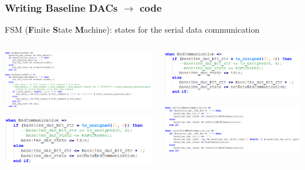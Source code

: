 \documentclass[aspectratio=169]{beamer}
\begin{document}
	\begin{frame}[fragile]
		\frametitle{Writing Baseline DACs $\rightarrow$ code}
		FSM (\textbf{F}inite \textbf{S}tate \textbf{M}achine): states for the serial data communication 
		{\tiny
		\begin{columns}
		
		\begin{center}
			\includegraphics[width=0.95 \textwidth]{IMG/SetbaselineDac.png}
			
			\vspace{1 cm}
			\includegraphics[width=0.85 \textwidth]{IMG/EndCommunication.png}
		\end{center}
		
	
		\begin{center}
			\includegraphics[width=0.85 \textwidth]{IMG/EndCommunication.png}
			
			\vspace{1 cm}
			\includegraphics[width=0.85 \textwidth]{IMG/EndCommunication2.png}
		\end{center}
	
		\end{columns}
	}
	\end{frame}
\end{document}
